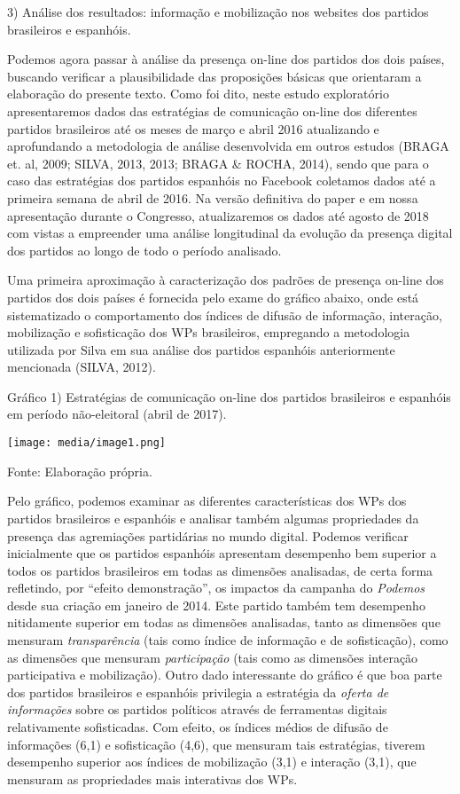3) Análise dos resultados: informação e mobilização nos websites dos
partidos brasileiros e espanhóis.

Podemos agora passar à análise da presença on-line dos partidos dos dois
países, buscando verificar a plausibilidade das proposições básicas que
orientaram a elaboração do presente texto. Como foi dito, neste estudo
exploratório apresentaremos dados das estratégias de comunicação on-line
dos diferentes partidos brasileiros até os meses de março e abril 2016
atualizando e aprofundando a metodologia de análise desenvolvida em
outros estudos (BRAGA et. al, 2009; SILVA, 2013, 2013; BRAGA \& ROCHA,
2014), sendo que para o caso das estratégias dos partidos espanhóis no
Facebook coletamos dados até a primeira semana de abril de 2016. Na
versão definitiva do paper e em nossa apresentação durante o Congresso,
atualizaremos os dados até agosto de 2018 com vistas a empreender uma
análise longitudinal da evolução da presença digital dos partidos ao
longo de todo o período analisado.

Uma primeira aproximação à caracterização dos padrões de presença
on-line dos partidos dos dois países é fornecida pelo exame do gráfico
abaixo, onde está sistematizado o comportamento dos índices de difusão
de informação, interação, mobilização e sofisticação dos WPs
brasileiros, empregando a metodologia utilizada por Silva em sua análise
dos partidos espanhóis anteriormente mencionada (SILVA, 2012).

Gráfico 1) Estratégias de comunicação on-line dos partidos brasileiros e
espanhóis em período não-eleitoral (abril de 2017).

\texttt{[image: media/image1.png]}

Fonte: Elaboração própria.

Pelo gráfico, podemos examinar as diferentes características dos WPs dos
partidos brasileiros e espanhóis e analisar também algumas propriedades
da presença das agremiações partidárias no mundo digital. Podemos
verificar inicialmente que os partidos espanhóis apresentam desempenho
bem superior a todos os partidos brasileiros em todas as dimensões
analisadas, de certa forma refletindo, por ``efeito demonstração'', os
impactos da campanha do \emph{Podemos} desde sua criação em janeiro de
2014. Este partido também tem desempenho nitidamente superior em todas
as dimensões analisadas, tanto as dimensões que mensuram
\emph{transparência} (tais como índice de informação e de sofisticação),
como as dimensões que mensuram \emph{participação} (tais como as
dimensões interação participativa e mobilização). Outro dado
interessante do gráfico é que boa parte dos partidos brasileiros e
espanhóis privilegia a estratégia da \emph{oferta de informações} sobre
os partidos políticos através de ferramentas digitais relativamente
sofisticadas. Com efeito, os índices médios de difusão de informações
(6,1) e sofisticação (4,6), que mensuram tais estratégias, tiverem
desempenho superior aos índices de mobilização (3,1) e interação (3,1),
que mensuram as propriedades mais interativas dos WPs.

